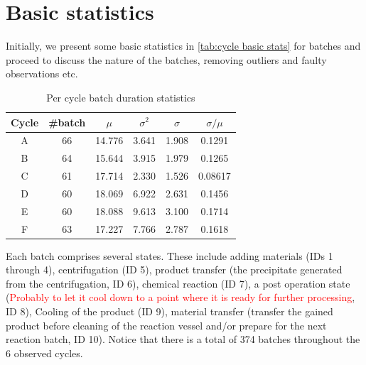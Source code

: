 \documentclass[../Thesis.tex]{subfiles}
\begin{document}



\section{Basic statistics}
Initially, we present some basic statistics in \autoref{tab:cycle basic stats} for batches and proceed to discuss the nature of the batches, removing outliers and faulty observations etc.



\begin{table}[h]
    \centering
    \begin{tabular}{c|c|c|c|c|c}
        Cycle & \#batch & $\mu$  & $\sigma^2$ & $\sigma$ & $\sigma / \mu$ \\ \hline
        A     & 66      & 14.776 & 3.641      & 1.908    & 0.1291         \\
        B     & 64      & 15.644 & 3.915      & 1.979    & 0.1265         \\
        C     & 61      & 17.714 & 2.330      & 1.526    & 0.08617        \\
        D     & 60      & 18.069 & 6.922      & 2.631    & 0.1456         \\
        E     & 60      & 18.088 & 9.613      & 3.100    & 0.1714         \\
        F     & 63      & 17.227 & 7.766      & 2.787    & 0.1618
    \end{tabular}
    \caption{Per cycle batch duration statistics}
    \label{tab:cycle basic stats}
\end{table}

Each batch comprises several states. These include adding materials (IDs 1 through 4), centrifugation (ID 5), product transfer (the precipitate generated from the centrifugation, ID 6), chemical reaction (ID 7), a post operation state (\textcolor{red}{Probably to let it cool down to a point where it is ready for further processing}, ID 8), Cooling of the product (ID 9), material transfer (transfer the gained product before cleaning of the reaction vessel and/or prepare for the next reaction batch, ID 10). Notice that there is a total of 374 batches throughout the 6 observed cycles.
\end{document}
